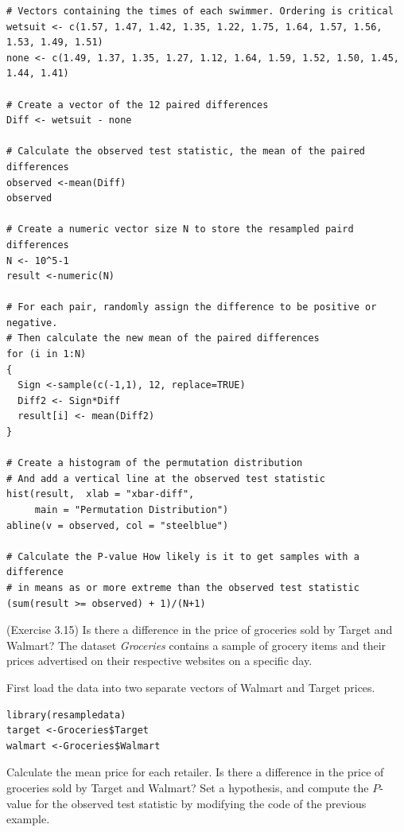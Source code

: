 \smallskip

 \smallskip



\begin{lstlisting}
# Vectors containing the times of each swimmer. Ordering is critical
wetsuit <- c(1.57, 1.47, 1.42, 1.35, 1.22, 1.75, 1.64, 1.57, 1.56, 1.53, 1.49, 1.51)
none <- c(1.49, 1.37, 1.35, 1.27, 1.12, 1.64, 1.59, 1.52, 1.50, 1.45, 1.44, 1.41)

# Create a vector of the 12 paired differences
Diff <- wetsuit - none

# Calculate the observed test statistic, the mean of the paired differences
observed <-mean(Diff) 
observed

# Create a numeric vector size N to store the resampled paird differences
N <- 10^5-1
result <-numeric(N)

# For each pair, randomly assign the difference to be positive or negative.
# Then calculate the new mean of the paired differences
for (i in 1:N)
{
  Sign <-sample(c(-1,1), 12, replace=TRUE)
  Diff2 <- Sign*Diff
  result[i] <- mean(Diff2)
}

# Create a histogram of the permutation distribution
# And add a vertical line at the observed test statistic
hist(result,  xlab = "xbar-diff",
     main = "Permutation Distribution")
abline(v = observed, col = "steelblue")

# Calculate the P-value How likely is it to get samples with a difference
# in means as or more extreme than the observed test statistic
(sum(result >= observed) + 1)/(N+1)
\end{lstlisting}

\clearpage

\bb[resume]
\ii (Exercise 3.15) Is there a difference in the price of groceries sold by Target and Walmart? The dataset \textit{Groceries} contains a sample of grocery items and their prices advertised on their respective websites on a specific day.

\bb
\ii First load the data into two separate vectors of Walmart and Target prices.
\begin{lstlisting}
library(resampledata)
target <-Groceries$Target
walmart <-Groceries$Walmart
\end{lstlisting}

\ii Calculate the mean price for each retailer. \vspace{1in}
\ii Is there a difference in the price of groceries sold by Target and Walmart? Set a hypothesis, and compute the $P$-value for the observed test statistic by modifying the code of the previous example.
\ee
\ee
